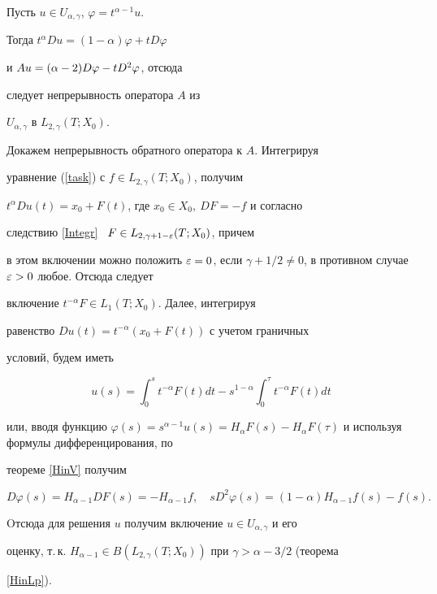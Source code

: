\begin{pf}


Пусть $u \in U_{\alpha,\gamma}$, $\varphi=t^{\alpha-1}u$.


Тогда $t^\alpha D u = (1-\alpha) \varphi + t D\varphi$


и $A u=\linebreak (\alpha-2)D\varphi-tD^2\varphi$, отсюда


следует непрерывность оператора $A$ из


$U_{\alpha,\gamma}$ в $L_{2,\gamma}(T;X_0)$.





Докажем непрерывность обратного оператора к $A$. Интегрируя


уравнение (\ref{task}) с $ f \in L_{2,\gamma}(T;X_0)$, получим


$t^\alpha D u(t)=x_0+F(t)$, где $x_0 \in X_0, \ D F=-f$ и согласно


следствию \ref{Integr} \ $F \in L_{2,\gamma+1-{\varepsilon}}(T;X_0)$, причем


в этом включении можно положить $\eps=0$, если $\gamma +1/2 \ne


0$, в противном случае $\eps >0$ любое. Отсюда следует


включение $t^{-\alpha}F \in L_1(T;X_0)$. Далее, интегрируя


равенство $D u(t)=t^{-\alpha}(x_0+F(t))$ с учетом граничных


условий, будем иметь


$$


u(s)=\int_0^s t^{-\alpha}F(t) d t


- s^{1-\alpha} \int_0^\tau t^{-\alpha}F(t) d t


$$


или, вводя функцию $\varphi(s)=s^{\alpha-1}u(s)=H_\alpha


F(s)-H_\alpha F(\tau)$ и используя формулы дифференцирования, по


теореме \ref{HinV} получим


$$


D\varphi(s)=H_{\alpha-1}D F(s)=-H_{\alpha-1} f, \quad


s D^2\varphi(s)=(1-\alpha)H_{\alpha-1}f(s)-f(s).


$$


Oтсюда для решения $u$ получим включение $u \in U_{\alpha,\gamma}$ и его


оценку, т.\,к. $H_{\alpha-1} \in


B(L_{2,\gamma}(T;X_0))$ при $\gamma > \alpha-3/2$ (теорема


\ref{HinLp}).


\end{pf}





